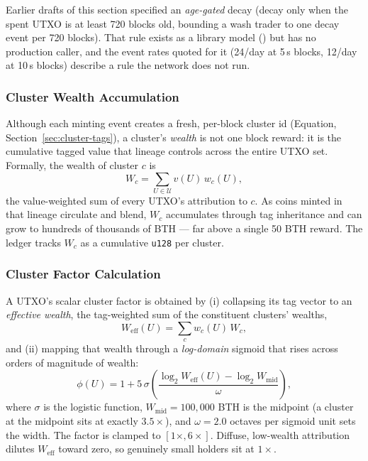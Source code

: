 Earlier drafts of this section specified an \emph{age-gated} decay (decay
only when the spent UTXO is at least 720 blocks old, bounding a wash trader to
one decay event per 720 blocks). That rule exists as a library model
() but has no production caller, and the
event rates quoted for it (24/day at 5\,s blocks, 12/day at 10\,s blocks)
describe a rule the network does not run.

\subsubsection{Cluster Wealth Accumulation}
\label{sec:cluster-wealth}

Although each minting event creates a fresh, per-block cluster id
(Equation, Section~\ref{sec:cluster-tags}), a cluster's \emph{wealth} is not
one block reward: it is the cumulative tagged value that lineage controls
across the entire UTXO set. Formally, the wealth of cluster $c$ is
\begin{equation}
W_c = \sum_{U \in \mathcal{U}} v(U)\, w_c(U),
\end{equation}
the value-weighted sum of every UTXO's attribution to $c$. As coins minted in
that lineage circulate and blend, $W_c$ accumulates through tag inheritance
and can grow to hundreds of thousands of BTH --- far above a single 50 BTH
reward. The ledger tracks $W_c$ as a cumulative \texttt{u128} per cluster.

\subsubsection{Cluster Factor Calculation}

A UTXO's scalar cluster factor is obtained by (i) collapsing its tag vector
to an \emph{effective wealth}, the tag-weighted sum of the constituent
clusters' wealths,
\begin{equation}
W_{\text{eff}}(U) = \sum_{c} w_c(U)\, W_c,
\end{equation}
and (ii) mapping that wealth through a \emph{log-domain} sigmoid that rises
across orders of magnitude of wealth:
\begin{equation}
\phi(U) = 1 + 5\,\sigma\!\left(\frac{\log_2 W_{\text{eff}}(U) - \log_2 W_{\text{mid}}}{\omega}\right),
\end{equation}
where $\sigma$ is the logistic function, $W_{\text{mid}} = 100{,}000$ BTH is
the midpoint (a cluster at the midpoint sits at exactly $3.5\times$), and
$\omega = 2.0$ octaves per sigmoid unit sets the width. The factor is clamped
to $[1\times, 6\times]$. Diffuse, low-wealth attribution dilutes
$W_{\text{eff}}$ toward zero, so genuinely small holders sit at $1\times$.

